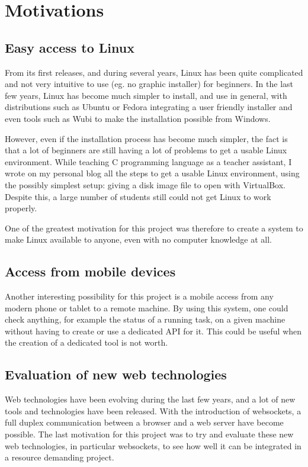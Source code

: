 \section{Motivations}
\subsection{Easy access to Linux}
From its first releases, and during several years, Linux has been quite 
complicated and not very intuitive to use (eg. no graphic installer) for beginners.
In the last few years, Linux has become much simpler to install, and use in general, 
with distributions such as Ubuntu or Fedora integrating a user friendly installer 
and even tools such as Wubi to make the installation possible from Windows.

However, even if the installation process has become much simpler, the fact is that 
a lot of beginners are still having a lot of problems to get a usable Linux environment. 
While teaching C programming language as a teacher assistant, I wrote 
on my personal blog all the steps to get a usable Linux environment, using the 
possibly simplest setup: giving a disk image file to open with VirtualBox. 
Despite this, a large number of students still could not get Linux to work properly.

One of the greatest motivation for this project was therefore to create a system to 
make Linux available to anyone, even with no computer knowledge at all.
%
\subsection{Access from mobile devices}
Another interesting possibility for this project is a mobile access from any modern 
phone or tablet to a remote machine. By using this system, one could check anything,
for example the status of a running task,  on a given machine without having 
to create or use a dedicated API for it. This could be useful when the creation of 
a dedicated tool is not worth.
%
\subsection{Evaluation of new web technologies }
Web technologies have been evolving during the last few years, and a lot 
of new tools and technologies have been released. With the introduction of
websockets, a full duplex communication between a browser and a web server 
have become possible. 
The last motivation for this project was to try and evaluate these new web 
technologies, in particular websockets, to see how well it can be integrated 
in a resource demanding project.

